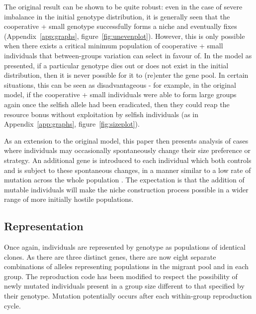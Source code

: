 \documentclass[11pt]{article}
\begin{document}
The original result can be shown to be quite robust: even in the case of severe imbalance in the initial genotype distribution, it is generally seen that the cooperative + small genotype successfully forms a niche and eventually fixes (Appendix~\ref{app:graphs}, figure~\ref{fig:unevenplot}). However, this is only possible when there exists a critical minimum population of cooperative + small individuals that between-groups variation can select in favour of. In the model as presented, if a particular genotype dies out or does not exist in the initial distribution, then it is never possible for it to (re)enter the gene pool. In certain situations, this can be seen as disadvantageous  - for example, in the original model, if the cooperative + small individuals were able to form large groups again once the selfish allele had been eradicated, then they could reap the resource bonus without exploitation by selfish individuals (as in Appendix~\ref{app:graphs}, figure~\ref{fig:sizeplot}).

As an extension to the original model, this paper then presents analysis of cases where individuals may occasionally spontaneously change their size preference or strategy. An additional gene is introduced to each individual which both controls and is subject to these spontaneous changes, in a manner similar to a low rate of mutation across the whole population \citep{adaption}. The expectation is that the addition of mutable individuals will make the niche construction process possible in a wider range of more initially hostile populations.
\subsection{Representation}
Once again, individuals are represented by genotype as populations of identical clones. As there are three distinct genes, there are now eight separate combinations of alleles representing populations in the migrant pool and in each group. The reproduction code has been modified to respect the possibility of newly mutated individuals present in a group size different to that specified by their genotype. Mutation potentially occurs after each within-group reproduction cycle.
\end{document}
